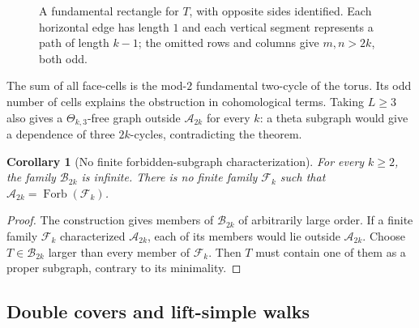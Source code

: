 \documentclass{article}
\newcommand{\Forb}{\operatorname{Forb}}
\newtheorem{corollary}[theorem]{Corollary}
\theoremstyle{definition}
\theoremstyle{remark}
\begin{document}
\begin{figure}[htbp]
\centering
{}
\caption{A fundamental rectangle for $T$, with opposite sides identified.
Each horizontal edge has length $1$ and each vertical segment represents
a path of length $k-1$; the omitted rows and columns give $m,n>2k$, both odd.}
\label{fig:toroidal-obstruction}
\end{figure}


The sum of all face-cells is the mod-$2$ fundamental two-cycle of the
torus.  Its odd number of cells explains the obstruction in cohomological
terms.  Taking $L\geq3$ also gives a $\Theta_{k,3}$-free graph outside
$\mathcal A_{2k}$ for every $k$: a theta subgraph would give a dependence
of three $2k$-cycles, contradicting the theorem.

\begin{corollary}[No finite forbidden-subgraph characterization]\label{cor:no-finite-obstruction-list}
For every $k\geq2$, the family $\mathcal B_{2k}$ is infinite.  There is
no finite family $\mathcal F_k$ such that
$\mathcal A_{2k}=\Forb(\mathcal F_k)$.
\end{corollary}
\begin{proof}
The construction gives members of $\mathcal B_{2k}$ of arbitrarily large
order.  If a finite family $\mathcal F_k$ characterized $\mathcal A_{2k}$,
each of its members would lie outside $\mathcal A_{2k}$.  Choose
$T\in\mathcal B_{2k}$ larger than every member of $\mathcal F_k$.  Then
$T$ must contain one of them as a proper subgraph, contrary to its
minimality.
\end{proof}

\subsection{Double covers and lift-simple walks}\label{subsec:double-covers}
\end{document}
